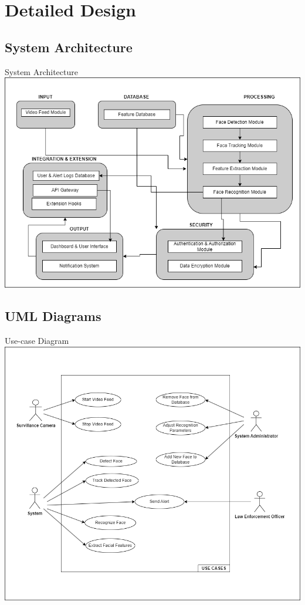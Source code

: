 \section{Detailed Design}

\subsection{System Architecture}
\begin{frame}{System Architecture}
	\centering
	\includegraphics[height=0.8\textheight]{components/images/sys-arch.png}
\end{frame}

\subsection{UML Diagrams}
\begin{frame}{Use-case Diagram}
	\centering
	\includegraphics[height=0.8 \textheight]{components/images/use-case.png}
\end{frame}

